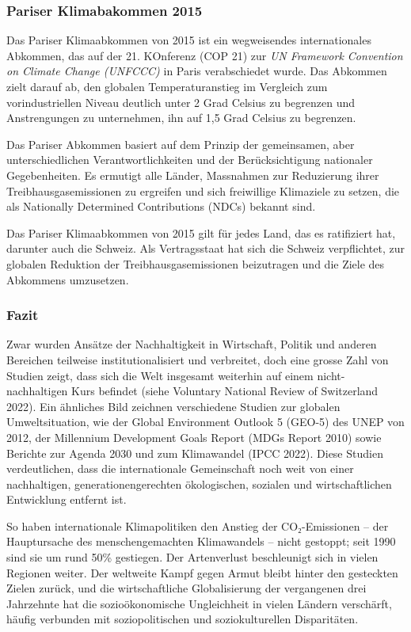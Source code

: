 \documentclass[
  letterpaper,
  DIV=11,
  numbers=noendperiod]{scrartcl}
\begin{document}
\subsubsection{Pariser Klimabakommen
2015}\label{pariser-klimabakommen-2015}

Das Pariser Klimaabkommen von 2015 ist ein wegweisendes internationales
Abkommen, das auf der 21. KOnferenz (COP 21) zur \emph{UN Framework
Convention on Climate Change (UNFCCC)} in Paris verabschiedet wurde. Das
Abkommen zielt darauf ab, den globalen Temperaturanstieg im Vergleich
zum vorindustriellen Niveau deutlich unter 2 Grad Celsius zu begrenzen
und Anstrengungen zu unternehmen, ihn auf 1,5 Grad Celsius zu begrenzen.

Das Pariser Abkommen basiert auf dem Prinzip der gemeinsamen, aber
unterschiedlichen Verantwortlichkeiten und der Berücksichtigung
nationaler Gegebenheiten. Es ermutigt alle Länder, Massnahmen zur
Reduzierung ihrer Treibhausgasemissionen zu ergreifen und sich
freiwillige Klimaziele zu setzen, die als Nationally Determined
Contributions (NDCs) bekannt sind.

Das Pariser Klimaabkommen von 2015 gilt für jedes Land, das es
ratifiziert hat, darunter auch die Schweiz. Als Vertragsstaat hat sich
die Schweiz verpflichtet, zur globalen Reduktion der
Treibhausgasemissionen beizutragen und die Ziele des Abkommens
umzusetzen.

\subsubsection{Fazit}\label{fazit}

Zwar wurden Ansätze der Nachhaltigkeit in Wirtschaft, Politik und
anderen Bereichen teilweise institutionalisiert und verbreitet, doch
eine grosse Zahl von Studien zeigt, dass sich die Welt insgesamt
weiterhin auf einem nicht-nachhaltigen Kurs befindet (siehe Voluntary
National Review of Switzerland 2022). Ein ähnliches Bild zeichnen
verschiedene Studien zur globalen Umweltsituation, wie der Global
Environment Outlook 5 (GEO-5) des UNEP von 2012, der Millennium
Development Goals Report (MDGs Report 2010) sowie Berichte zur Agenda
2030 und zum Klimawandel (IPCC 2022). Diese Studien verdeutlichen, dass
die internationale Gemeinschaft noch weit von einer nachhaltigen,
generationengerechten ökologischen, sozialen und wirtschaftlichen
Entwicklung entfernt ist.

So haben internationale Klimapolitiken den Anstieg der CO₂-Emissionen --
der Hauptursache des menschengemachten Klimawandels -- nicht gestoppt;
seit 1990 sind sie um rund 50\% gestiegen. Der Artenverlust beschleunigt
sich in vielen Regionen weiter. Der weltweite Kampf gegen Armut bleibt
hinter den gesteckten Zielen zurück, und die wirtschaftliche
Globalisierung der vergangenen drei Jahrzehnte hat die sozioökonomische
Ungleichheit in vielen Ländern verschärft, häufig verbunden mit
soziopolitischen und soziokulturellen Disparitäten.
\end{document}

